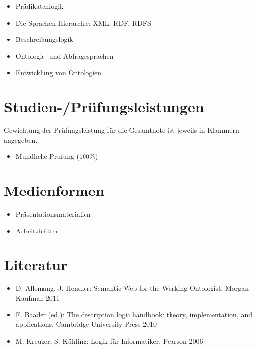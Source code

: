 \begin{itemize}
\tightlist
\item
  Prädikatenlogik
\item
  Die Sprachen Hierarchie: XML, RDF, RDFS
\item
  Beschreibungslogik
\item
  Ontologie- und Abfragesprachen
\item
  Entwicklung von Ontologien
\end{itemize}

\section*{Studien-/Prüfungsleistungen\label{/mi-2017/modulbeschreibungen-master/MA_WTW_Modul_Logik-und-semantische-Modellierung}}\label{studien-pruxfcfungsleistungenpathlabelmi-2017modulbeschreibungen-mastermaux5fwtwux5fmodulux5flogik-und-semantische-modellierung}

Gewichtung der Prüfungsleistung für die Gesamtnote ist jeweils in
Klammern angegeben.

\begin{itemize}
\tightlist
\item
  Mündliche Prüfung (100\%)
\end{itemize}

\section*{Medienformen\label{/mi-2017/modulbeschreibungen-master/MA_WTW_Modul_Logik-und-semantische-Modellierung}}\label{medienformenpathlabelmi-2017modulbeschreibungen-mastermaux5fwtwux5fmodulux5flogik-und-semantische-modellierung}

\begin{itemize}
\tightlist
\item
  Präsentationsmaterialien
\item
  Arbeitsblätter
\end{itemize}

\section*{Literatur\label{/mi-2017/modulbeschreibungen-master/MA_WTW_Modul_Logik-und-semantische-Modellierung}}\label{literaturpathlabelmi-2017modulbeschreibungen-mastermaux5fwtwux5fmodulux5flogik-und-semantische-modellierung}

\begin{itemize}
\tightlist
\item
  D. Allemang, J. Hendler: Semantic Web for the Working Ontologist,
  Morgan Kaufman 2011
\item
  F. Baader (ed.): The description logic handbook: theory,
  implementation, and applications, Cambridge University Press 2010
\item
  M. Kreuzer, S. Kühling: Logik für Informatiker, Pearson 2006
\end{itemize}

